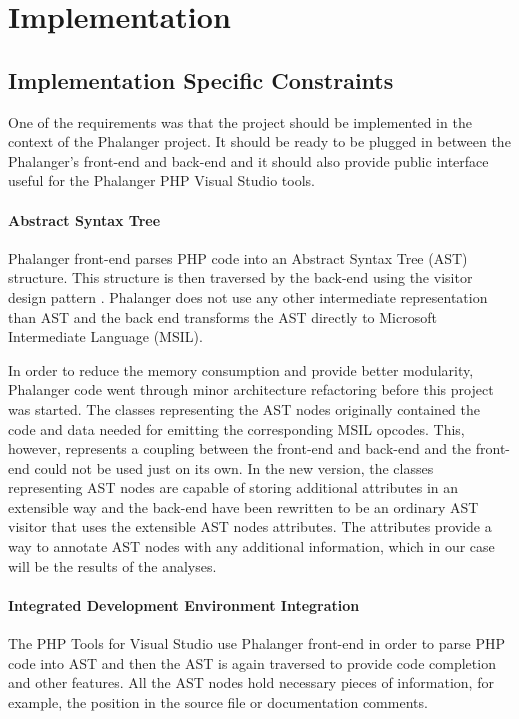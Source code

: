 \chapter{Implementation}

    \section{Implementation Specific Constraints}
    
    One of the requirements was that the project should be implemented 
    in the context of the Phalanger project. It should be ready 
    to be plugged in between the Phalanger's front-end and back-end and 
    it should also provide public interface useful for the 
    Phalanger PHP Visual Studio tools.
    
    \subsubsection*{Abstract Syntax Tree}     
    Phalanger front-end parses PHP code 
    into an Abstract Syntax Tree (AST) \cite{aho1985compilers} structure. 
    This structure is then traversed by the back-end using the 
    visitor design pattern \cite{gamma1994design}. Phalanger does not 
    use any other intermediate representation than AST and the 
    back end transforms the AST directly to Microsoft Intermediate Language (MSIL).
    
    In order to reduce the memory consumption and provide better 
    modularity, Phalanger code went through minor architecture 
    refactoring before this project was started.     
    The classes representing the AST nodes originally contained 
    the code and data needed for emitting the corresponding 
    MSIL opcodes. This, however, represents 
    a coupling between the front-end and back-end and the 
    front-end could not be used just on its own. In the new 
    version, the classes representing AST nodes are capable 
    of storing additional attributes in an extensible way 
    and the back-end have been rewritten to be an ordinary AST 
    visitor that uses the extensible AST nodes attributes.
    The attributes provide a way to annotate AST nodes 
    with any additional information, which in our case will be 
    the results of the analyses.    
    
    \subsubsection*{Integrated Development Environment Integration}
    The PHP Tools for Visual Studio use Phalanger front-end in order to 
    parse PHP code into AST and then the AST is again traversed to provide 
    code completion and other features. All the AST nodes hold necessary 
    pieces of information, for example, the position in the source file or 
    documentation comments.
    
